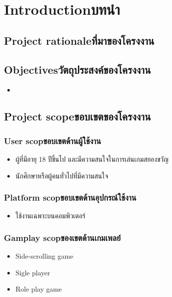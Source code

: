 \chapter{\ifenglish Introduction\else บทนำ\fi}

\section{\ifenglish Project rationale\else ที่มาของโครงงาน\fi}

\section{\ifenglish Objectives\else วัตถุประสงค์ของโครงงาน\fi}
\begin{itemize}
    \item 
\end{itemize}

\section{\ifenglish Project scope\else ขอบเขตของโครงงาน\fi}

\subsection{\ifenglish User scop\else ขอบเขตด้านผู้ใช้งาน\fi}
\begin{itemize}
    \item ผู้ที่มีอายุ 18 ปีขึ้นไป และมีความสนใจในการเล่นเกมสยองขวัญ
    \item นักศึกษาหรือผู้คนทั่วไปที่มีความสนใจ
\end{itemize}

\subsection{\ifenglish Platform scop\else ขอบเขตด้านอุปกรณ์ใช้งาน\fi}
\begin{itemize}
    \item ใช้งานเฉพาะบนคอมพิวเตอร์
\end{itemize}

\subsection{\ifenglish Gamplay scop\else ของเขตด้านเกมเพลย์\fi}
\begin{itemize}
    \item Side-scrolling game
    \item Sigle player
    \item Role play game
\end{itemize}

